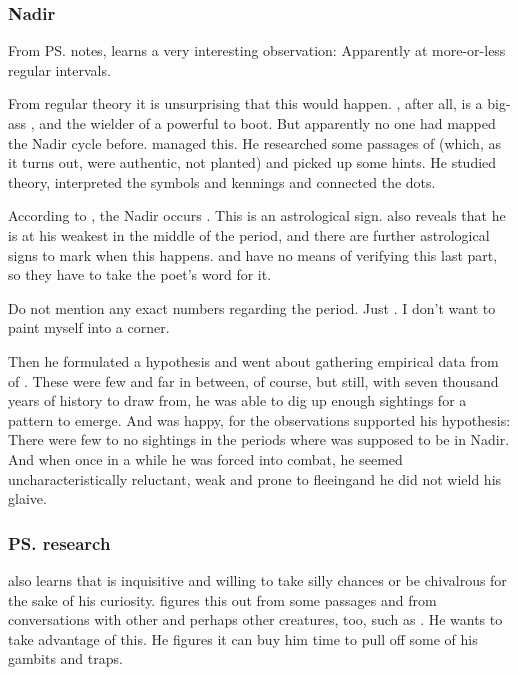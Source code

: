 \begin{garbage}
\subsubsection{Nadir}
From \ps{\Lothagiel} notes, \Teshrial{} learns a very interesting observation: 
Apparently  at more-or-less regular intervals. 

From regular \matrix{} theory it is unsurprising that this would happen. 
\Ishnaruchaefir, after all, is a big-ass \vertex, and the wielder of a powerful  to boot. 
But apparently no one had mapped the Nadir cycle before. 
\Lothagiel{} managed this. 
He researched some passages of \emph{\WanderersInDarkness} (which, as it turns out, were authentic, not planted) and picked up some hints. 
He studied \matrix{} theory, interpreted the symbols and kennings and connected the dots. 

According to \emph{\WanderersInDarkness}, the Nadir occurs . 
This is an astrological sign. 
\emph{\WanderersInDarkness} also reveals that he is at his weakest in the middle of the period, and there are further astrological signs to mark when this happens. 
\Teshrial{} and \Lothagiel{} have no means of verifying this last part, so they have to take the poet's word for it. 

Do not mention any exact numbers regarding the period. 
Just . 
I don't want to paint myself into a corner.

Then he formulated a hypothesis and went about gathering empirical data from  of \Ishnaruchaefir. 
These were few and far in between, of course, but still, with seven thousand years of history to draw from, he was able to dig up enough sightings for a pattern to emerge. 
And \Lothagiel{} was happy, for the observations supported his hypothesis: 
There were few to no sightings in the periods where \Ishnaruchaefir{} was supposed to be in Nadir. 
And when once in a while he was forced into combat, he seemed uncharacteristically reluctant, weak and prone to fleeing\dash and he did not wield his glaive. 









\subsubsection{\ps{\Teshrial} research}
\Teshrial{} also learns that \Ishnaruchaefir{} is inquisitive and willing to take silly chances or be chivalrous for the sake of his curiosity. 
\Teshrial{} figures this out from some \emph{\WanderersInDarkness} passages and from conversations with other \resphain{}\dash and perhaps other creatures, too, such as \quiljaaran. 
He wants to take advantage of this. 
He figures it can buy him time to pull off some of his gambits and traps. 






\end{garbage}
